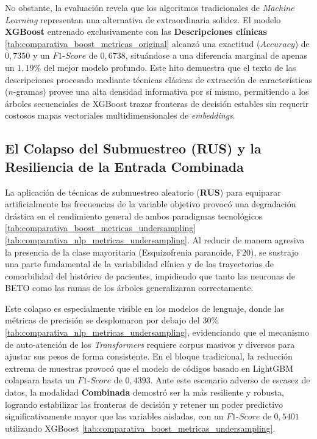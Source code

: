 \documentclass[12pt,a4paper,onecolumn,oneside]{report}
\begin{document}
No obstante, la evaluación revela que los algoritmos tradicionales de \textit{Machine Learning} representan una alternativa de extraordinaria solidez. El modelo \textbf{XGBoost} entrenado exclusivamente con las \textbf{Descripciones clínicas} \ref{tab:comparativa_boost_metricas_original} alcanzó una exactitud ($Accuracy$) de $0,7350$ y un $F1\text{-}Score$ de $0,6738$, situándose a una diferencia marginal de apenas un $1,19\%$ del mejor modelo profundo. Este hito demuestra que el texto de las descripciones procesado mediante técnicas clásicas de extracción de características ($n$-gramas) provee una alta densidad informativa por sí mismo, permitiendo a los árboles secuenciales de XGBoost trazar fronteras de decisión estables sin requerir costosos mapas vectoriales multidimensionales de \textit{embeddings}.

\subsection{El Colapso del Submuestreo (RUS) y la Resiliencia de la Entrada Combinada}

La aplicación de técnicas de submuestreo aleatorio (\textbf{RUS}) para equiparar artificialmente las frecuencias de la variable objetivo provocó una degradación drástica en el rendimiento general de ambos paradigmas tecnológicos \ref{tab:comparativa_boost_metricas_undersampling} \ref{tab:comparativa_nlp_metricas_undersampling}. Al reducir de manera agresiva la presencia de la clase mayoritaria (Esquizofrenia paranoide, F20), se sustrajo una parte fundamental de la variabilidad clínica y de las trayectorias de comorbilidad del histórico de pacientes, impidiendo que tanto las neuronas de BETO como las ramas de los árboles generalizaran correctamente.

Este colapso es especialmente visible en los modelos de lenguaje, donde las métricas de precisión se desplomaron por debajo del $30\%$ \ref{tab:comparativa_nlp_metricas_undersampling}, evidenciando que el mecanismo de auto-atención de los \textit{Transformers} requiere corpus masivos y diversos para ajustar sus pesos de forma consistente. En el bloque tradicional, la reducción extrema de muestras provocó que el modelo de códigos basado en LightGBM colapsara hasta un $F1\text{-}Score$ de $0,4393$. Ante este escenario adverso de escasez de datos, la modalidad \textbf{Combinada} demostró ser la más resiliente y robusta, logrando estabilizar las fronteras de decisión y retener un poder predictivo significativamente mayor que las variables aisladas, con un $F1\text{-}Score$ de $0,5401$ utilizando XGBoost \ref{tab:comparativa_boost_metricas_undersampling}.
\end{document}
